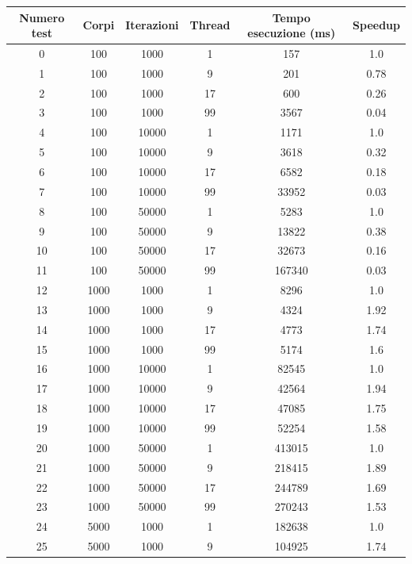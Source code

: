 \documentclass[12pt,a4paper,openright,twoside]{book}
\begin{document}
\begin{table}[h!]
	\centering
	\begin{tabular}{ |c|c|c|c|c|c| } 
		\hline
		Numero test & Corpi & Iterazioni & Thread & Tempo esecuzione (ms) & Speedup \\
		\hline
		0 & 100 & 1000 & 1 & 157 & 1.0 \\ 
		\hline
		1 & 100 & 1000 & 9 & 201 & 0.78 \\ 
		\hline
		2 & 100 & 1000 & 17 & 600 & 0.26 \\ 
		\hline
		3 & 100 & 1000 & 99 & 3567 & 0.04 \\ 
		\hline
		4 & 100 & 10000 & 1 & 1171 & 1.0 \\ 
		\hline
		5 & 100 & 10000 & 9 & 3618 & 0.32 \\ 
		\hline
		6 & 100 & 10000 & 17 & 6582 & 0.18 \\ 
		\hline
		7 & 100 & 10000 & 99 & 33952 & 0.03 \\ 
		\hline
		8 & 100 & 50000 & 1 & 5283 & 1.0 \\ 
		\hline
		9 & 100 & 50000 & 9 & 13822 & 0.38 \\ 
		\hline
		10 & 100 & 50000 & 17 & 32673 & 0.16 \\ 
		\hline
		11 & 100 & 50000 & 99 & 167340 & 0.03 \\ 
		\hline
		12 & 1000 & 1000 & 1 & 8296 & 1.0 \\ 
		\hline
		13 & 1000 & 1000 & 9 & 4324 & 1.92 \\ 
		\hline
		14 & 1000 & 1000 & 17 & 4773 & 1.74 \\ 
		\hline
		15 & 1000 & 1000 & 99 & 5174 & 1.6 \\ 
		\hline
		16 & 1000 & 10000 & 1 & 82545 & 1.0 \\ 
		\hline
		17 & 1000 & 10000 & 9 & 42564 & 1.94 \\ 
		\hline
		18 & 1000 & 10000 & 17 & 47085 & 1.75 \\ 
		\hline
		19 & 1000 & 10000 & 99 & 52254 & 1.58 \\ 
		\hline
		20 & 1000 & 50000 & 1 & 413015 & 1.0 \\ 
		\hline
		21 & 1000 & 50000 & 9 & 218415 & 1.89 \\ 
		\hline
		22 & 1000 & 50000 & 17 & 244789 & 1.69 \\ 
		\hline
		23 & 1000 & 50000 & 99 & 270243 & 1.53 \\ 
		\hline
		24 & 5000 & 1000 & 1 & 182638 & 1.0 \\ 
		\hline
		25 & 5000 & 1000 & 9 & 104925 & 1.74 \\ 

\end{tabular}
\end{table}
\end{document}
